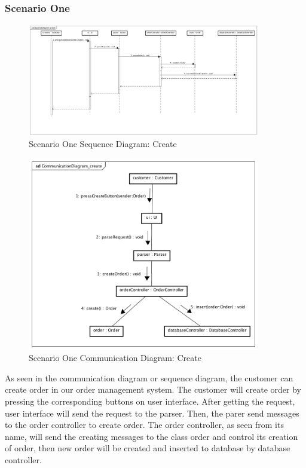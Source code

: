 \documentclass[12pt]{scrreprt}
\begin{document}
\subsubsection{Scenario One}
\begin{figure}[H]
  \centering\includegraphics[width=4in]{DocumentRes/1SequenceDiagram_create.png}
  \caption{Scenario One Sequence Diagram: Create}
\end{figure}
\begin{figure}[H]
  \centering\includegraphics[width=4in]{DocumentRes/1CommunicationDiagram_create.png}
  \caption{Scenario One Communication Diagram: Create}
\end{figure}
As seen in the communication diagram or sequence diagram, the customer can create order in our order management system. The customer will create order by pressing the corresponding buttons on user interface. After getting the request, user interface will send the request to the parser. Then, the parer send messages to the order controller to create order. The order controller, as seen from its name, will send the creating messages to the class order and control its creation of order, then new order will be created and inserted to database by database controller.
\end{document}

